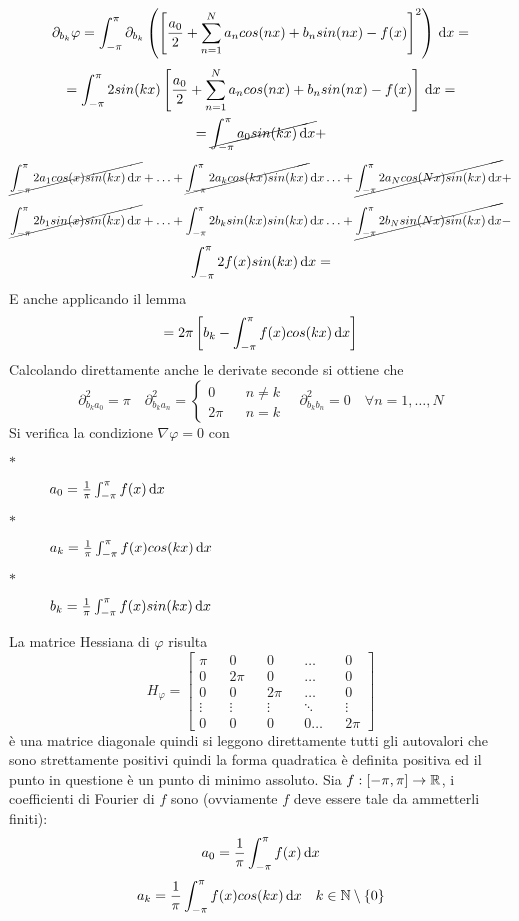\[\partial_{b_k}\varphi = \int_{-\pi}^{\pi}\partial_{b_k}\left(\left[\frac{a_0}{2}+\sum\limits_{n=1}^{N}a_{n}cos(nx)+b_{n}sin(nx)-f(x)\right]^2\right)\,\mathrm{d}{x}=\]
\[ = \int_{-\pi}^{\pi} 2sin(kx) \left[\frac{a_0}{2}+\sum\limits_{n=1}^{N}a_{n}cos(nx)+b_{n}sin(nx)-f(x)\right]\,\mathrm{d}{x}=\]
\[ =  \cancel{\int_{-\pi}^{\pi} a_0sin(kx)\,\mathrm{d}{x}} + \]
\[\cancel{\int_{-\pi}^{\pi} 2a_1cos(x)sin(kx)\,\mathrm{d}{x}} +
\ldots +
\cancel{\int_{-\pi}^{\pi} 2a_k cos(kx)sin(kx)}\,\mathrm{d}{x}
\ldots +
\cancel{\int_{-\pi}^{\pi} 2a_N cos(Nx)sin(kx)\,\mathrm{d}{x}} + \]
\[\cancel{\int_{-\pi}^{\pi} 2b_1sin(x)sin(kx)\,\mathrm{d}{x}} +
\ldots +
\int_{-\pi}^{\pi} 2b_k sin(kx)sin(kx)\,\mathrm{d}{x}
\ldots +
\cancel{\int_{-\pi}^{\pi} 2b_N sin(Nx)sin(kx)\,\mathrm{d}{x}} - \]
\[\int_{-\pi}^{\pi} 2f(x)sin(kx)\,\mathrm{d}{x} = \]
E anche applicando il lemma
\[=2\pi\left[b_k-\int_{-\pi}^{\pi}f(x)cos(kx)\,\mathrm{d}{x}\right]\]
Calcolando direttamente anche le derivate seconde si ottiene che
\[\partial^2_{b_ka_0}=\pi\quad\partial^2_{b_ka_n}=
\left\{\begin{matrix}
0&&n\ne k\\2\pi&&n=k
\end{matrix}\right.
\quad\partial^2_{b_kb_n}=0\quad\forall n=1,\dotsc,N\]
Si verifica la condizione $\nabla\varphi = 0$ con
\begin{description}
	\item[$\ast$] $a_0=\frac{1}{\pi}\int_{-\pi}^{\pi}f(x)\,\mathrm{d}{x}$
	\item[$\ast$] $a_k=\frac{1}{\pi}\int_{-\pi}^{\pi}f(x)cos(kx)\,\mathrm{d}{x}$
	\item[$\ast$] $b_k=\frac{1}{\pi}\int_{-\pi}^{\pi}f(x)sin(kx)\,\mathrm{d}{x}$
\end{description}
La matrice Hessiana di $\varphi$ risulta \[H_{\varphi}=\left[\begin{matrix}
\pi&&0&&0&&\ldots&&0\\
0&&2\pi&&0&&\ldots&&0\\
0&&0&&2\pi&&\ldots&&0\\
\vdots&&\vdots&&\vdots&&\ddots&&\vdots\\
0&&0&&0&&0\ldots&&2\pi
\end{matrix}\right]\]
è una matrice diagonale quindi si leggono direttamente tutti gli autovalori che sono strettamente positivi quindi la forma quadratica è definita positiva ed il punto in questione è un punto di minimo assoluto.
Sia $f: \left[-\pi,\pi\right] \to \mathbb{R}$, i coefficienti di Fourier di $f$ sono (ovviamente $f$ deve essere tale da ammetterli finiti):
\[a_0=\frac{1}{\pi}\int_{-\pi}^{\pi}f(x)\,\mathrm{d}{x}\]
\[a_k=\frac{1}{\pi}\int_{-\pi}^{\pi}f(x)cos(kx)\,\mathrm{d}{x}\quad k\in\mathbb{N}\setminus{\left\{0\right\}}\]
